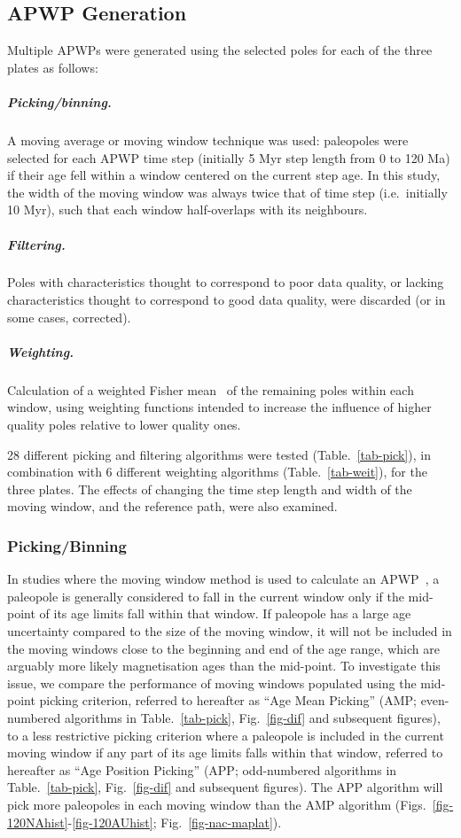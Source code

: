 \subsection{APWP Generation}

Multiple APWPs were generated using the selected poles for each of the three
plates as follows:

\subparagraph{Picking/binning.} A moving average or moving window technique
was used: paleopoles were selected for each APWP time step (initially 5 Myr
step length from 0 to 120 Ma) if their age fell within a window centered on the
current step age. In this study, the width of the moving window was always twice
that of time step (i.e.\ initially 10 Myr), such that each window half-overlaps
with its neighbours.

\subparagraph{Filtering.} Poles with characteristics thought to correspond to
poor data quality, or lacking characteristics thought to correspond to good
data quality, were discarded (or in some cases, corrected).

\subparagraph{Weighting.} Calculation of a weighted Fisher mean~\cite{F53} of
the remaining poles within each window, using weighting functions intended to
increase the influence of higher quality poles relative to lower quality ones.

28 different picking and filtering algorithms were tested
(Table.~\ref{tab-pick}), in combination with 6 different weighting algorithms
(Table.~\ref{tab-weit}), for the three plates. The effects of changing the time
step length and width of the moving window, and the reference path, were also
examined.

\subsubsection{Picking/Binning}

In studies where the moving window method is used to calculate an
APWP~\cite{T99,T08}, a paleopole is generally considered to fall in the
current window only if the mid-point of its age limits fall within that window.
If paleopole has a large age uncertainty compared to the size of the moving
window, it will not be included in the moving windows close to the beginning and
end of the age range, which are arguably more likely magnetisation ages than the
mid-point. To investigate this issue, we compare the performance of moving
windows populated using the mid-point picking criterion, referred to hereafter
as ``Age Mean Picking'' (AMP; even-numbered algorithms in Table.~\ref{tab-pick},
Fig.~\ref{fig-dif} and subsequent figures), to a less restrictive picking
criterion where a paleopole is included in the current moving window if any part
of its age limits falls within that window, referred to hereafter as ``Age
Position Picking'' (APP; odd-numbered algorithms in Table.~\ref{tab-pick},
Fig.~\ref{fig-dif} and subsequent figures). The APP algorithm will pick more
paleopoles in each moving window than the AMP algorithm
(Figs.~\ref{fig-120NAhist}-\ref{fig-120AUhist}; Fig.~\ref{fig-nac-maplat}).

